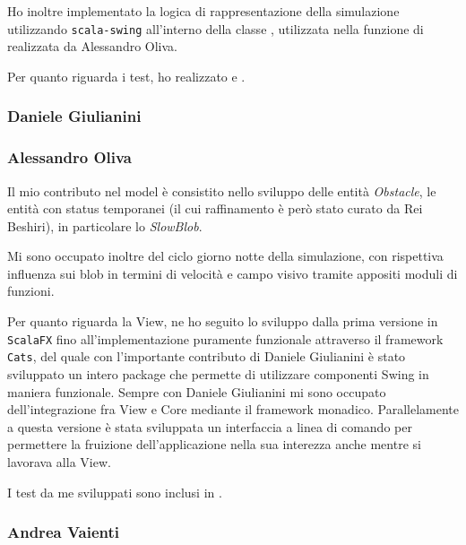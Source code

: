 Ho inoltre implementato la logica di rappresentazione della simulazione utilizzando \texttt{scala-swing} all'interno della classe , utilizzata nella funzione  di  realizzata da Alessandro Oliva.

Per quanto riguarda i test, ho realizzato  e .

\subsubsection{Daniele Giulianini}

\subsubsection{Alessandro Oliva}
Il mio contributo nel model è consistito nello sviluppo delle entità \textit{Obstacle}, le entità con status temporanei (il cui raffinamento è però stato curato da Rei Beshiri), in particolare lo \textit{SlowBlob}.

Mi sono occupato inoltre del ciclo giorno notte della simulazione, con rispettiva influenza sui blob in termini di velocità e campo visivo tramite appositi moduli di funzioni.

Per quanto riguarda la View, ne ho seguito lo sviluppo dalla prima versione in \texttt{ScalaFX} fino all'implementazione puramente funzionale attraverso il framework \texttt{Cats}, del quale con l'importante contributo di Daniele Giulianini è stato sviluppato un intero package che permette di utilizzare componenti Swing in maniera funzionale. Sempre con Daniele Giulianini mi sono occupato dell'integrazione fra View e Core mediante il framework monadico. Parallelamente a questa versione è stata sviluppata un interfaccia a linea di comando per permettere la fruizione dell'applicazione nella sua interezza anche mentre si lavorava alla View.

I test da me sviluppati sono inclusi in .
\subsubsection{Andrea Vaienti}